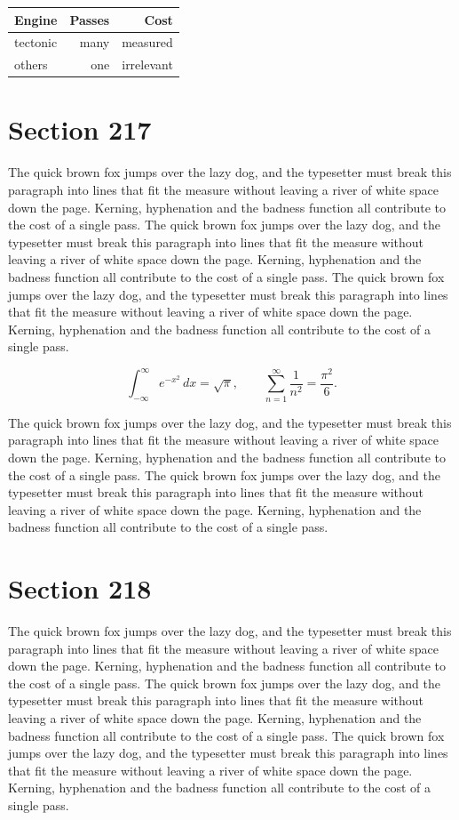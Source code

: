 \documentclass{article}
\begin{document}
\begin{center}
\begin{tabular}{lrr}
\toprule
Engine & Passes & Cost \\
\midrule
tectonic & many & measured \\
others & one & irrelevant \\
\bottomrule
\end{tabular}
\end{center}

\section{Section 217}
The quick brown fox jumps over the lazy dog, and the typesetter must break this paragraph into lines that fit the measure without leaving a river of white space down the page. Kerning, hyphenation and the badness function all contribute to the cost of a single pass. The quick brown fox jumps over the lazy dog, and the typesetter must break this paragraph into lines that fit the measure without leaving a river of white space down the page. Kerning, hyphenation and the badness function all contribute to the cost of a single pass. The quick brown fox jumps over the lazy dog, and the typesetter must break this paragraph into lines that fit the measure without leaving a river of white space down the page. Kerning, hyphenation and the badness function all contribute to the cost of a single pass. 

\begin{equation}
\int_{-\infty}^{\infty} e^{-x^{2}}\,dx = \sqrt{\pi}, \qquad
\sum_{n=1}^{\infty} \frac{1}{n^{2}} = \frac{\pi^{2}}{6}.
\end{equation}

The quick brown fox jumps over the lazy dog, and the typesetter must break this paragraph into lines that fit the measure without leaving a river of white space down the page. Kerning, hyphenation and the badness function all contribute to the cost of a single pass. The quick brown fox jumps over the lazy dog, and the typesetter must break this paragraph into lines that fit the measure without leaving a river of white space down the page. Kerning, hyphenation and the badness function all contribute to the cost of a single pass. 
\section{Section 218}
The quick brown fox jumps over the lazy dog, and the typesetter must break this paragraph into lines that fit the measure without leaving a river of white space down the page. Kerning, hyphenation and the badness function all contribute to the cost of a single pass. The quick brown fox jumps over the lazy dog, and the typesetter must break this paragraph into lines that fit the measure without leaving a river of white space down the page. Kerning, hyphenation and the badness function all contribute to the cost of a single pass. The quick brown fox jumps over the lazy dog, and the typesetter must break this paragraph into lines that fit the measure without leaving a river of white space down the page. Kerning, hyphenation and the badness function all contribute to the cost of a single pass. 
\end{document}
